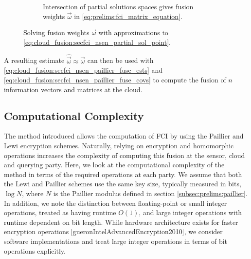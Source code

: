 \begin{figure}[htbp]
\begin{subfigure}[htbp]{\textwidth}
\begin{center}
        \end{center}
        \caption{Intersection of partial solutions spaces gives fusion weights $\vec{\omega}$ in \eqref{eq:prelims:fci_matrix_equation}.}
        \label{fig:cloud_fusion:secfci_partial_sol_intersection}
    \end{subfigure}
    \caption{Solving fusion weights $\vec{\omega}$ with approximations to \eqref{eq:cloud_fusion:secfci_nsen_partial_sol_point}.}
    \label{fig:cloud_fusion:secfci_nsen_partial_sols_and_intersect}
\end{figure}

A resulting estimate $\hat{\vec{\omega}} \approx \vec{\omega}$ can then be used with \eqref{eq:cloud_fusion:secfci_nsen_paillier_fuse_ests} and \eqref{eq:cloud_fusion:secfci_nsen_paillier_fuse_covs} to compute the fusion of $n$ information vectors and matrices at the cloud.

% 
% 

\subsection{Computational Complexity}\label{subsec:cloud_fusion:secfci_comp_complexity}
The method introduced allows the computation of FCI by using the Paillier and Lewi encryption schemes. Naturally, relying on encryption and homomorphic operations increases the complexity of computing this fusion at the sensor, cloud and querying party. Here, we look at the computational complexity of the method in terms of the required operations at each party. We assume that both the Lewi and Paillier schemes use the same key size, typically measured in bits, $\log{N}$, where $N$ is the Paillier modulus defined in section \ref{subsec:prelims:paillier}. In addition, we note the distinction between floating-point or small integer operations, treated as having runtime $O(1)$, and large integer operations with runtime dependent on bit length. While hardware architecture exists for faster encryption operations [gueronIntelAdvancedEncryption2010], we consider software implementations and treat large integer operations in terms of bit operations explicitly.

